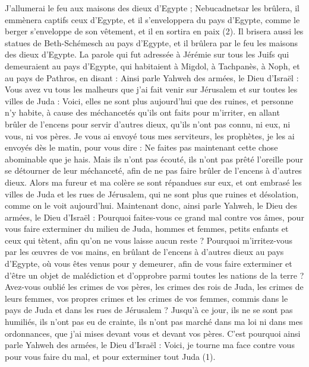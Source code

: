 \begin{multicols}{2}
J'allumerai le feu aux maisons des dieux d'Egypte ; Nebucadnetsar les brûlera, il emmènera captifs ceux d'Egypte, et il s’enveloppera du pays d'Egypte, comme le berger s'enveloppe de son vêtement, et il en sortira en paix\FTNT{} (2).
Il brisera aussi les statues de Beth-Schémesch au pays d'Egypte, et il brûlera par le feu les maisons des dieux d'Egypte.
\VerseOne{}La parole qui fut adressée à Jérémie sur tous les Juifs qui demeuraient au pays d'Egypte, qui habitaient à Migdol, à Tachpanès, à Noph, et au pays de Pathros, en disant :
Ainsi parle Yahweh des armées, le Dieu d'Israël : Vous avez vu tous les malheurs que j'ai fait venir sur Jérusalem et sur toutes les villes de Juda : Voici, elles ne sont plus aujourd'hui que des ruines, et personne n'y habite,
à cause des méchancetés qu'ils ont faits pour m'irriter, en allant brûler de l’encens pour servir d'autres dieux, qu’ils n'ont pas connu, ni eux, ni vous, ni vos pères.
Je vous ai envoyé tous mes serviteurs, les prophètes, je les ai envoyés dès le matin, pour vous dire : Ne faites pas maintenant cette chose abominable que je hais.
Mais ils n'ont pas écouté, ils n'ont pas prêté l’oreille pour se détourner de leur méchanceté, afin de ne pas faire brûler de l’encens à d'autres dieux.
Alors ma fureur et ma colère se sont répandues sur eux, et ont embrasé les villes de Juda et les rues de Jérusalem, qui ne sont plus que ruines et désolation, comme on le voit aujourd'hui.
Maintenant donc, ainsi parle Yahweh, le Dieu des armées, le Dieu d'Israël : Pourquoi faites-vous ce grand mal contre vos âmes, pour vous faire exterminer du milieu de Juda, hommes et femmes, petits enfants et ceux qui tètent, afin qu'on ne vous laisse aucun reste ?
Pourquoi m'irritez-vous par les œuvres de vos mains, en brûlant de l’encens à d'autres dieux au pays d'Egypte, où vous êtes venus pour y demeurer, afin de vous faire exterminer et d’être un objet de malédiction et d’opprobre parmi toutes les nations de la terre ?
Avez-vous oublié les crimes de vos pères, les crimes des rois de Juda, les crimes de leurs femmes, vos propres crimes et les crimes de vos femmes, commis dans le pays de Juda et dans les rues de Jérusalem ?
Jusqu’à ce jour, ils ne se sont pas humiliés, ils n'ont pas eu de crainte, ils n'ont pas marché dans ma loi ni dans mes ordonnances, que j’ai mises devant vous et devant vos pères.
C'est pourquoi ainsi parle Yahweh des armées, le Dieu d'Israël : Voici, je tourne ma face contre vous pour vous faire du mal, et pour exterminer tout Juda\FTNT{} (1).

\end{multicols}
